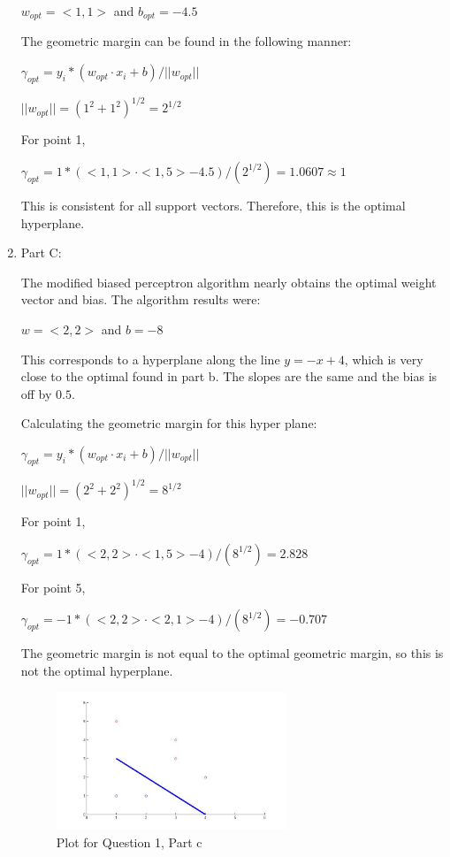 \documentclass[12pt]{article}
\begin{document}
\begin{enumerate}
$w_{opt} = <1, 1>$ and $b_{opt} = -4.5$

The geometric margin can be found in the following manner:

$\gamma_{opt} = y_i*(w_{opt} \cdot x_i + b)/||w_{opt}||$

$||w_{opt}|| = (1^2+1^2)^{1/2} = 2^{1/2}$

For point 1,

$\gamma_{opt} = 1*(<1,1> \cdot <1,5> -4.5)/(2^{1/2}) = 1.0607 \approx 1$

This is consistent for all support vectors. Therefore, this is the optimal hyperplane.


\item Part C:

The modified biased perceptron algorithm nearly obtains the optimal weight vector and bias. The algorithm results were:

$w = <2,2>$ and $b = -8$

This corresponds to a hyperplane along the line $y = -x + 4$, which is very close to the optimal found in part b. The slopes are the same and the bias is off by $0.5$. 

Calculating the geometric margin for this hyper plane:

$\gamma_{opt} = y_i*(w_{opt} \cdot x_i + b)/||w_{opt}||$

$||w_{opt}|| = (2^2+2^2)^{1/2} = 8^{1/2}$

For point 1,

$\gamma_{opt} = 1*(<2,2> \cdot <1,5> -4)/(8^{1/2}) = 2.828$

For point 5,

$\gamma_{opt} = -1*(<2,2> \cdot <2,1> -4)/(8^{1/2}) = -0.707$

The geometric margin is not equal to the optimal geometric margin, so this is not the optimal hyperplane.


\begin{figure}[h!]
  \caption{Plot for Question 1, Part c}
  \centering
    \includegraphics[width=0.65\textwidth]{hw3_1c}
\end{figure}


\end{enumerate}
\end{document}
